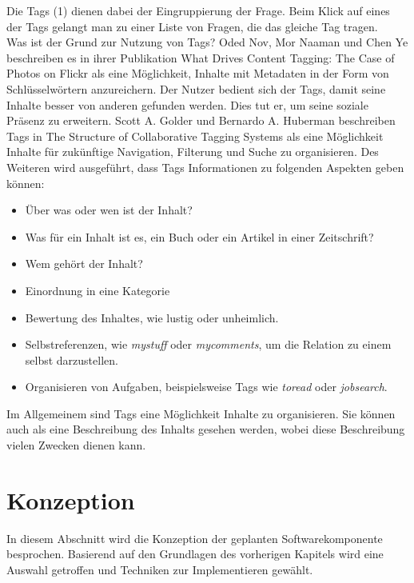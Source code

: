 \documentclass[a4paper]{article}
\begin{document}
	Die Tags (1) dienen dabei der Eingruppierung der Frage. Beim Klick auf eines
	der Tags gelangt man zu einer Liste von Fragen, die das gleiche Tag tragen. \\
	
	Was ist der Grund zur Nutzung von Tags? Oded Nov, Mor Naaman und Chen Ye
	beschreiben es in ihrer Publikation What Drives Content Tagging: The Case of
	Photos on Flickr \cite{CaseTag} als eine Möglichkeit, Inhalte mit Metadaten
	in der Form von Schlüsselwörtern anzureichern. Der Nutzer bedient sich der Tags, 
	damit seine Inhalte besser von anderen gefunden werden. Dies tut er, um seine
	soziale	Präsenz zu erweitern. Scott A. Golder und Bernardo A. Huberman
	beschreiben Tags in The Structure of Collaborative Tagging 
	Systems \cite{CollTag} als eine	Möglichkeit Inhalte für zukünftige Navigation,
	Filterung und Suche zu organisieren. Des Weiteren wird ausgeführt, dass Tags
	Informationen zu folgenden Aspekten geben können:
	
	\begin{itemize}
		\item Über was oder wen ist der Inhalt?
		\item Was für ein Inhalt ist es, ein Buch oder ein Artikel
		in einer Zeitschrift?
		\item Wem gehört der Inhalt?
		\item Einordnung in eine Kategorie
		\item Bewertung des Inhaltes, wie lustig oder unheimlich.
		\item Selbstreferenzen, wie \emph{mystuff} oder \emph{mycomments},
		um die Relation zu einem selbst darzustellen.
		\item Organisieren von Aufgaben, beispielsweise Tags wie \emph{toread} oder
		\emph{jobsearch}.
	\end{itemize}
	
	Im Allgemeinem sind Tags eine Möglichkeit Inhalte zu organisieren. Sie können
	auch als eine Beschreibung des Inhalts gesehen werden, wobei diese Beschreibung
	vielen Zwecken dienen kann.
		
	\newpage
	
	\section{Konzeption}	
	
	In diesem Abschnitt wird die Konzeption der geplanten Softwarekomponente
	besprochen. Basierend auf den Grundlagen des vorherigen Kapitels wird eine
	Auswahl getroffen und Techniken zur Implementieren gewählt.
	
\end{document}
